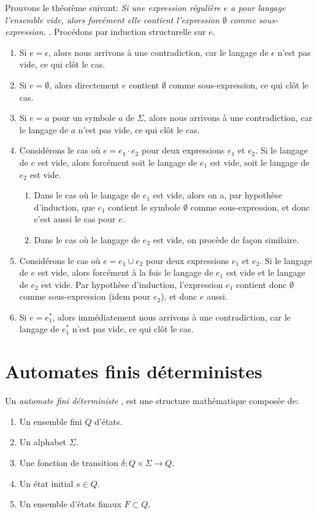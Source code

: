 Prouvons le théorème suivant: \og \textit{Si une expression régulière $e$ a pour langage l'ensemble vide, alors forcément elle contient l'expression $\emptyset$ comme sous-expression.} \fg.
Procédons par induction structurelle sur $e$.
\begin{enumerate}
\item Si $e = \epsilon$, alors nous arrivons à une contradiction, car le langage de $\epsilon$ n'est pas vide, ce qui clôt le cas.
\item Si $e = \emptyset$, alors directement $e$ contient $\emptyset$ comme sous-expression, ce qui clôt le cas.
\item Si $e = a$ pour un symbole $a$ de $\Sigma$, alors nous arrivons à une contradiction, car le langage de $a$ n'est pas vide, ce qui clôt le cas.
\item Considérons le cas où $e = e_1 \cdot e_2$ pour deux expressions $e_1$ et $e_2$.
      Si le langage de $e$ est vide, alors forcément soit le langage de $e_1$ est vide, soit le langage de $e_2$ est vide.
      \begin{enumerate}
      \item Dans le cas où le langage de $e_1$ est vide, alors on a, par hypothèse d'induction,
            que $e_1$ contient le symbole $\emptyset$ comme sous-expression, et donc c'est aussi le cas pour $e$.
      \item Dans le cas où le langage de $e_2$ est vide, on procède de façon similaire.
      \end{enumerate}
\item Considérons le cas où $e = e_1 \cup e_2$ pour deux expressions $e_1$ et $e_2$.
      Si le langage de $e$ est vide, alors forcément à la fois le langage de $e_1$ est vide et le langage de $e_2$ est vide.
      Par hypothèse d'induction, l'expression $e_1$ contient donc $\emptyset$ comme sous-expression (idem pour $e_2$), et donc $e$ aussi.
\item Si $e = e_1^*$, alors immédiatement nous arrivons à une contradiction, car le langage de $e_1^*$ n'est pas vide, ce qui clôt le cas.
\end{enumerate}

\section{Automates finis déterministes}

Un \og \textit{automate fini déterministe} \fg{}, est une structure mathématique composée de:
\begin{enumerate}
\item Un ensemble fini $Q$ d'états.
\item Un alphabet $\Sigma$.
\item Une fonction de transition $\delta : Q \times \Sigma \to Q$.
\item Un état initial $s \in Q$.
\item Un ensemble d'états finaux $F \subset Q$.
\end{enumerate}

